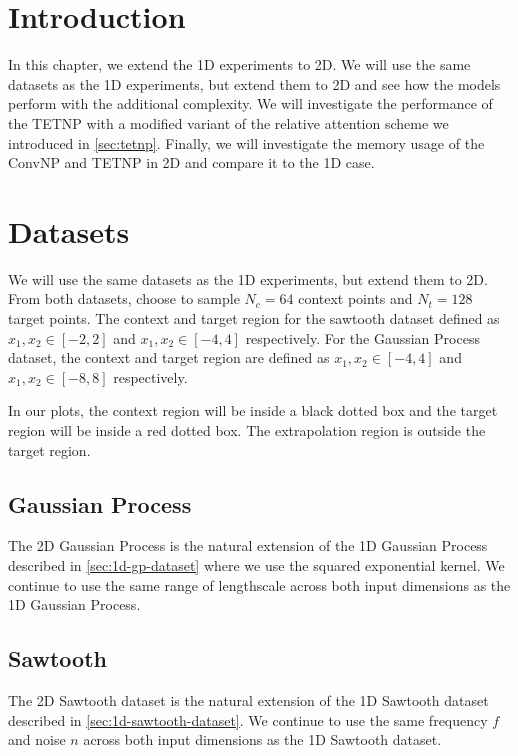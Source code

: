 \documentclass[../../main.tex]{subfiles}
\begin{document}
\section{Introduction}

In this chapter, we extend the 1D experiments to 2D. We will use the same datasets as the 1D experiments, but extend them to 2D and see how the models perform with the additional complexity. We will investigate the performance of the TETNP with a modified variant of the relative attention scheme we introduced in \autoref{sec:tetnp}. Finally, we will investigate the memory usage of the ConvNP and TETNP in 2D and compare it to the 1D case.

\section{Datasets}

We will use the same datasets as the 1D experiments, but extend them to 2D. From both datasets, choose to sample $N_c = 64$ context points and $N_t = 128$ target points. The context and target region for the sawtooth dataset defined as $x_1, x_2 \in [-2, 2]$ and $x_1, x_2 \in [-4, 4]$ respectively. For the Gaussian Process dataset, the context and target region are defined as $x_1, x_2 \in [-4, 4]$ and $x_1, x_2 \in [-8, 8]$ respectively.  

In our plots, the context region will be inside a black dotted box and the target region will be inside a red dotted box. The extrapolation region is outside the target region.

\subsection{Gaussian Process}

The 2D Gaussian Process is the natural extension of the 1D Gaussian Process described in \autoref{sec:1d-gp-dataset} where we use the squared exponential kernel. We continue to use the same range of lengthscale across both input dimensions as the 1D Gaussian Process. 




\subsection{Sawtooth}

The 2D Sawtooth dataset is the natural extension of the 1D Sawtooth dataset described in \autoref{sec:1d-sawtooth-dataset}. We continue to use the same frequency $f$ and noise $n$ across both input dimensions as the 1D Sawtooth dataset.
\end{document}
